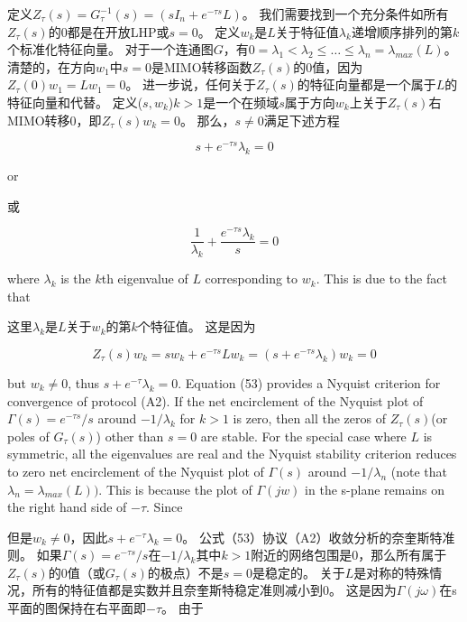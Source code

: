 \documentclass{article}
\begin{document}
\noindent 定义$Z_{\tau}(s) = G_{\tau}^{-1}(s) = (sI_n + e^{-\tau s}L)$。
我们需要找到一个充分条件如所有$Z_{\tau}(s)$的0都是在开放LHP或$s=0$。
定义$w_k$是$L$关于特征值$\lambda_k$递增顺序排列的第$k$个标准化特征向量。
对于一个连通图$G$，有$0=\lambda_1 < \lambda_2 \le \dots \le  \lambda_n =\lambda_{max}(L)$。
清楚的，在方向$w_1$中$s=0$是MIMO转移函数$Z_{\tau}(s)$的0值，因为$Z_{\tau}(0)w_1 = Lw_1 = 0$。
进一步说，任何关于$Z_{\tau}(s)$的特征向量都是一个属于$L$的特征向量和代替。
定义($s,w_k$)$k>1$是一个在频域$s$属于方向$w_k$上关于$Z_{\tau}(s)$右MIMO转移0，即$Z_{\tau}(s)w_k=0$。
那么，$s\ne0$满足下述方程

\begin{equation}
    \tag{52}
    \label{52}
    s+e^{-\tau s}\lambda_k = 0
\end{equation}

{\color[gray]{0.5}
\noindent or
}

\noindent 或


\begin{equation}
    \tag{53}
    \label{53}
    \frac{1}{\lambda_k} + \frac{e^{-\tau s}\lambda_k}{s} = 0
\end{equation}

{\color[gray]{0.5}
\noindent where $\lambda_k$ is the $k$th eigenvalue of $L$ corresponding to $w_k$. 
This is due to the fact that
}

\noindent 这里$\lambda_k$是$L$关于$w_k$的第$k$个特征值。
这是因为

\begin{equation}
    \tag{54}
    \label{54}
    Z_{\tau}(s) w_k = sw_k + e^{-\tau s}Lw_k = (s+e^{-\tau s}\lambda_k)w_k = 0
\end{equation}

{\color[gray]{0.5}
\noindent but $w_k\ne 0$, thus $s+e^{-\tau}\lambda_k=0$. 
Equation (53) provides a Nyquist criterion for convergence of protocol (A2). 
If the net encirclement of the Nyquist plot of $\Gamma(s) = e^{-\tau s}/s$ around $-1/\lambda_k$ for $k>1$ is zero, then all the zeros of $Z_\tau(s)$(or poles of $G_{\tau}(s)$) other than $s=0$ are stable.
For the special case where $L$ is symmetric, all the eigenvalues are real and the Nyquist stability criterion reduces to zero net encirclement of the Nyquist plot of $\Gamma(s)$ around $-1/\lambda_n$ (note that $\lambda_n=\lambda_{max}(L))$. 
This is because the plot of $\Gamma(jw)$ in the s-plane remains on the right hand side of $-\tau$. 
Since
}

\noindent 但是$w_k\ne 0$，因此$s+e^{-\tau}\lambda_k=0$。
公式（53）协议（A2）收敛分析的奈奎斯特准则。
如果$\Gamma(s) = e^{-\tau s}/s$在$-1/\lambda_k$其中$k>1$附近的网络包围是0，那么所有属于$Z_\tau(s)$的0值（或$G_{\tau}(s)$的极点）不是$s=0$是稳定的。
关于$L$是对称的特殊情况，所有的特征值都是实数并且奈奎斯特稳定准则减小到0。
这是因为$\Gamma(j\omega)$在s平面的图保持在右平面即$-\tau$。
由于
\end{document}
